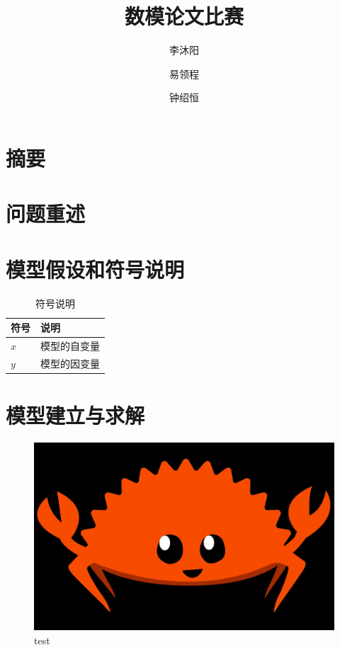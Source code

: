 \documentclass[UTF8]{ctexart}
\title{数模论文比赛}
\author{李沐阳 \and 易领程 \and 钟绍恒}
\begin{document}
  \maketitle

  \newpage

  \tableofcontents


  \newpage

  \section{摘要}

  \newpage

  \section{问题重述}

  \newpage

  \section{模型假设和符号说明}

  \begin{table}[h]
    \centering
    \caption{符号说明}
    \begin{tabular}{p{6em}l}
      \hline 
      符号 & 说明 \\
      \hline 
      $x$ & 模型的自变量 \\
      $y$ & 模型的因变量 \\
      \hline
    \end{tabular}
  \end{table}

  \newpage

  \section{模型建立与求解}

  \begin{figure}[h]
    \centering
    \includegraphics[scale=0.1]{rust.jpg}
    \caption{test}
  \end{figure}
\end{document}

